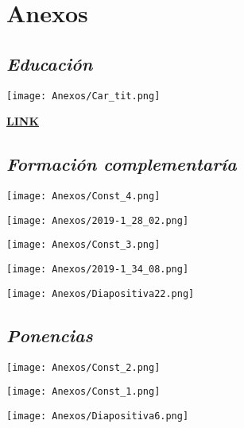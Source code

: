 \documentclass[11pt,a4paper,]{awesome-cv}
\begin{document}
\newpage

\hypertarget{anexos}{%
\section{Anexos}\label{anexos}}

\hypertarget{educaciuxf3n-1}{%
\subsection{\texorpdfstring{\emph{Educación}}{Educación}}\label{educaciuxf3n-1}}

\texttt{[image: Anexos/Car\_tit.png]}

\href{https://tesiunam.dgb.unam.mx/F/2MNVUNLIDPT5Q7V34YD9J46DL8Y6R9P1SQU2KN9KVMCLKK7PN6-14675?func=find-b\&local_base=TES01\&request=Relaci\%C3\%B3n+entre+el+desempe\%C3\%B1o+en+tareas+de+discriminaci\%C3\%B3n+num\%C3\%A9rica\%2C+temporal+y+espacial+en+diferentes+grupos+de+edad\&find_code=WRD\&adjacent=N\&filter_code_2=WYR\&filter_request_2=\&filter_code_3=WYR\&filter_request_3=}{\textbf{LINK}}

\newpage

\hypertarget{formaciuxf3n-complementaruxeda}{%
\subsection{\texorpdfstring{\emph{Formación
complementaría}}{Formación complementaría}}\label{formaciuxf3n-complementaruxeda}}

\texttt{[image: Anexos/Const\_4.png]}

\texttt{[image: Anexos/2019-1\_28\_02.png]}

\texttt{[image: Anexos/Const\_3.png]}

\texttt{[image: Anexos/2019-1\_34\_08.png]}

\texttt{[image: Anexos/Diapositiva22.png]}
\newpage

\hypertarget{ponencias-1}{%
\subsection{\texorpdfstring{\emph{Ponencias}}{Ponencias}}\label{ponencias-1}}

\texttt{[image: Anexos/Const\_2.png]}

\texttt{[image: Anexos/Const\_1.png]}

\texttt{[image: Anexos/Diapositiva6.png]}


\label{LastPage}~
\end{document}
